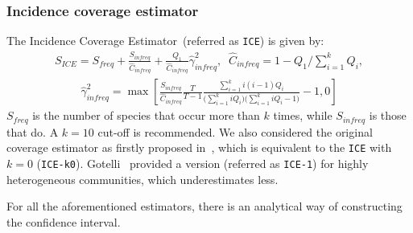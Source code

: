 \documentclass[sigconf,review,anonymous]{acmart}
\newcommand{\ICEallrare}{ICE-k0\xspace}
\newcounter{todocounter}
\newcommand{\todo}[1]{\marginpar{$|$}\textcolor{red}{\stepcounter{todocounter}\footnote[\thetodocounter]{\textcolor{red}{\textbf{TODO }}\textit{#1}}}}
\def\<#1>{\texttt{#1}}
\renewcommand{\todo}[1]{}
\begin{document}

\subsubsection{Incidence coverage estimator~\cite{chao1992estimating}} %
The Incidence Coverage Estimator~(referred as \<ICE>) %
is given by:
\begin{gather*}
  S_{\textit{ICE}} = S_{\textit{freq}} + \frac{S_{\textit{infreq}}}{\hat{C}_{\textit{infreq}}}
  + \frac{Q_1}{\hat{C}_{\textit{infreq}}}\hat{\gamma}^2_{\textit{infreq}},\;\; \hat{C}_{\textit{infreq}}=1-Q_{1}/\sum_{i=1}^{k}Q_{i},
\end{gather*}
\begin{gather*}
  \hat{\gamma}_{\textit{infreq}}^2 = \max\left[\frac{S_{\textit{infreq}}}{\hat{C}_{\textit{infreq}}}\frac{T}{T-1}
  \frac{\sum_{i=1}^{k} i(i-1)Q_i}{
    \big(\sum_{i=1}^{k} iQ_i\big) \big(\sum_{i=1}^{k} iQ_i-1\big)
  } -1,0
  \right]
\end{gather*}
$S_{\textit{freq}}$ is the number of species that occur more than $k$ times, %
while $S_{\textit{infreq}}$ is those that do. %
A $k=10$ cut-off is recommended. We also considered the original coverage estimator
as firstly proposed in~\cite{lee1994estimating}, which is equivalent to the
\<ICE> with $k=0$ (\<\ICEallrare>).
%
Gotelli~\cite{gotelli2013measuring} provided a version (referred as \<ICE-1>) for highly heterogeneous communities,
which underestimates less. %


For all the aforementioned estimators, there is an analytical way of constructing the confidence interval.

\end{document}
